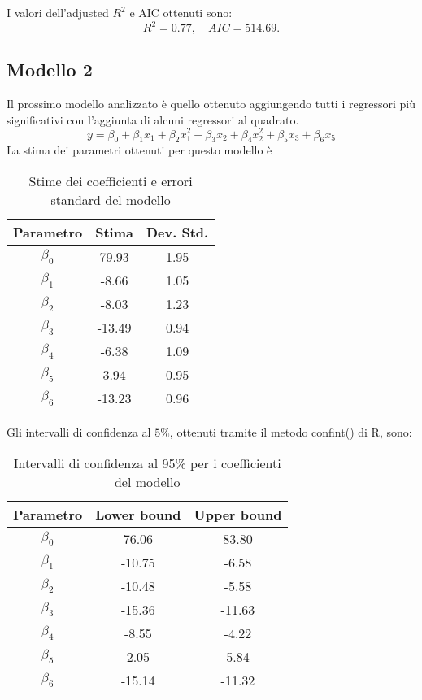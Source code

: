 I valori dell'adjusted $R^2$  e AIC ottenuti sono:
\begin{equation*}
	R^2 =  0.77, \quad AIC = 514.69.
\end{equation*}
\subsection{Modello 2}
Il prossimo modello analizzato è quello ottenuto aggiungendo tutti i regressori più significativi con l'aggiunta di alcuni regressori al quadrato.
\begin{equation*}
	y=\beta_0 + \beta_1x_1+\beta_2x_1^2+\beta_3x_2+\beta_4x_2^2+\beta_5x_3+\beta_6x_5
\end{equation*}
La stima dei parametri ottenuti per questo modello è
\begin{table}[H]
	\centering
	\begin{tabular}{|c|c|c|}
		\hline
		\textbf{Parametro} & \textbf{Stima} & \textbf{Dev. Std.} \\
		\hline
		$\beta_0$ & 79.93  & 1.95 \\
		$\beta_1$ & -8.66  & 1.05 \\
		$\beta_2$ & -8.03  & 1.23 \\
		$\beta_3$ & -13.49 & 0.94 \\
		$\beta_4$ & -6.38  & 1.09 \\
		$\beta_5$ & 3.94   & 0.95 \\
		$\beta_6$ & -13.23 & 0.96 \\
		\hline
	\end{tabular}
	\caption{Stime dei coefficienti e errori standard del modello}
	\label{tab:coef_estimates_poly}
\end{table}

Gli intervalli di confidenza al $5\%$, ottenuti tramite il metodo confint() di R, sono:
\begin{table}[H]
	\centering
	\begin{tabular}{|c|c|c|}
		\hline
		\textbf{Parametro} & \textbf{Lower bound} & \textbf{Upper bound} \\
		\hline
		$\beta_0$ & 76.06 & 83.80 \\
		$\beta_1$ & -10.75 & -6.58 \\
		$\beta_2$ & -10.48 & -5.58 \\
		$\beta_3$ & -15.36 & -11.63 \\
		$\beta_4$ & -8.55 & -4.22 \\
		$\beta_5$ & 2.05 & 5.84 \\
		$\beta_6$ & -15.14 & -11.32 \\
		\hline
	\end{tabular}
	\caption{Intervalli di confidenza al 95\% per i coefficienti del modello}
	\label{tab:ci_coefficienti}
\end{table}

